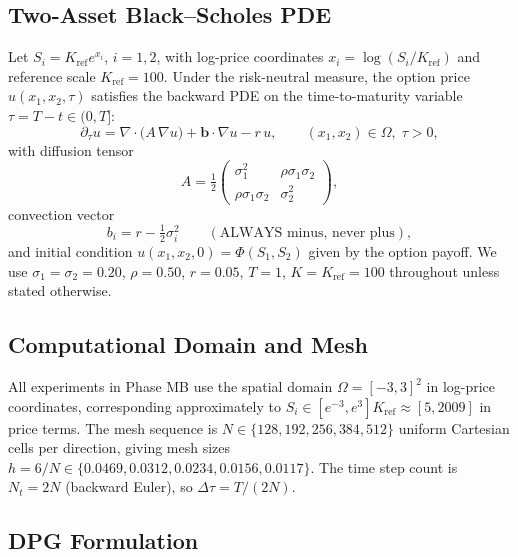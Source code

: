 \documentclass[11pt,a4paper]{article}
\newcommand{\Kref}{K_{\mathrm{ref}}}
\begin{document}
\subsection{Two-Asset Black–Scholes PDE}

Let $S_i = \Kref e^{x_i}$, $i=1,2$, with log-price coordinates
$x_i = \log(S_i/\Kref)$ and reference scale $\Kref = 100$.
Under the risk-neutral measure, the option price
$u(x_1,x_2,\tau)$ satisfies the backward PDE on the time-to-maturity variable
$\tau = T - t \in (0,T]$:
\begin{equation}\label{eq:pde}
  \partial_\tau u
  = \nabla\cdot\bigl(A\,\nabla u\bigr)
  + \mathbf{b}\cdot\nabla u
  - r\,u,
  \qquad (x_1,x_2)\in\Omega,\; \tau>0,
\end{equation}
with diffusion tensor
\begin{equation}
  A = \tfrac12\begin{pmatrix}\sigma_1^2 & \rho\sigma_1\sigma_2\\
  \rho\sigma_1\sigma_2 & \sigma_2^2\end{pmatrix},
\end{equation}
convection vector
\begin{equation}\label{eq:convection}
  b_i = r - \tfrac12\sigma_i^2 \qquad (\text{ALWAYS minus, never plus}),
\end{equation}
and initial condition $u(x_1,x_2,0) = \Phi(S_1,S_2)$ given by the option payoff.
We use $\sigma_1=\sigma_2=0.20$, $\rho=0.50$, $r=0.05$, $T=1$, $K=\Kref=100$
throughout unless stated otherwise.

\subsection{Computational Domain and Mesh}

All experiments in Phase MB use the spatial domain $\Omega = [-3,3]^2$ in
log-price coordinates, corresponding approximately to $S_i \in [e^{-3},e^3]\Kref
\approx [5, 2009]$ in price terms.  The mesh sequence is
$N \in \{128, 192, 256, 384, 512\}$ uniform Cartesian cells per direction,
giving mesh sizes $h = 6/N \in \{0.0469, 0.0312, 0.0234, 0.0156, 0.0117\}$.
The time step count is $N_t = 2N$ (backward Euler), so $\Delta\tau = T/(2N)$.

\subsection{DPG Formulation}
\end{document}
